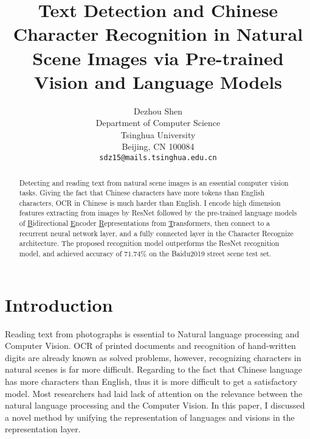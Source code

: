 \documentclass[review]{cvpr}
\begin{document}
\title{Text Detection and Chinese Character Recognition in Natural Scene Images via Pre-trained Vision and Language Models}

\author{Dezhou Shen\\
Department of Computer Science\\
Tsinghua University\\
Beijing, CN 100084\\
{\tt\small sdz15@mails.tsinghua.edu.cn}
}

\maketitle


\begin{abstract}

  Detecting and reading text from natural scene images is an essential computer vision tasks.
  Giving the fact that Chinese characters have more tokens than English characters, OCR in Chinese is much harder than English.
  I encode high dimension features extracting from images by ResNet followed by the pre-trained language models of
  \underline{B}idirectional \underline{E}ncoder \underline{R}epresentations from \underline{T}ransformers,
  then connect to a recurrent neural network layer, and a fully connected layer in the Character Recognize architecture.
  The proposed recognition model outperforms the ResNet recognition model, and achieved accuracy of $71.74\%$ on the Baidu2019 street scene test set.

\end{abstract}

\section{Introduction}

  Reading text from photographs is essential to Natural language processing and Computer Vision.
  OCR of printed documents and recognition of hand-written digits are already known as solved problems,
  however, recognizing characters in natural scenes is far more difficult.
  Regarding to the fact that Chinese language has more characters than English, thus it is more difficult to get a satisfactory model.
  Most researchers had laid lack of attention on the relevance between the natural language processing and the Computer Vision.
  In this paper, I discussed a novel method by unifying the representation of languages and visions in the representation layer.
\end{document}
